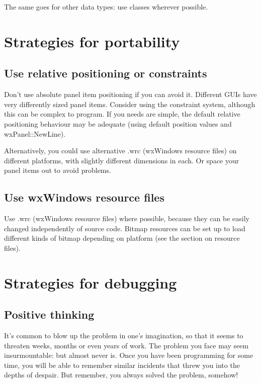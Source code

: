 The same goes for other data types: use classes wherever possible.

\section{Strategies for portability}

\subsection{Use relative positioning or constraints}

Don't use absolute panel item positioning if you can avoid it. Different GUIs have
very differently sized panel items. Consider using the constraint system, although this
can be complex to program. If you needs are simple, the default relative positioning
behaviour may be adequate (using default position values and wxPanel::NewLine).

Alternatively, you could use alternative .wrc (wxWindows resource files) on different
platforms, with slightly different dimensions in each. Or space your panel items out
to avoid problems.

\subsection{Use wxWindows resource files}

Use .wrc (wxWindows resource files) where possible, because they can be easily changed
independently of source code. Bitmap resources can be set up to load different
kinds of bitmap depending on platform (see the section on resource files).

\section{Strategies for debugging}

\subsection{Positive thinking}

It's common to blow up the problem in one's imagination, so that it seems to threaten
weeks, months or even years of work. The problem you face may seem insurmountable:
but almost never is. Once you have been programming for some time, you will be able
to remember similar incidents that threw you into the depths of despair. But
remember, you always solved the problem, somehow!

